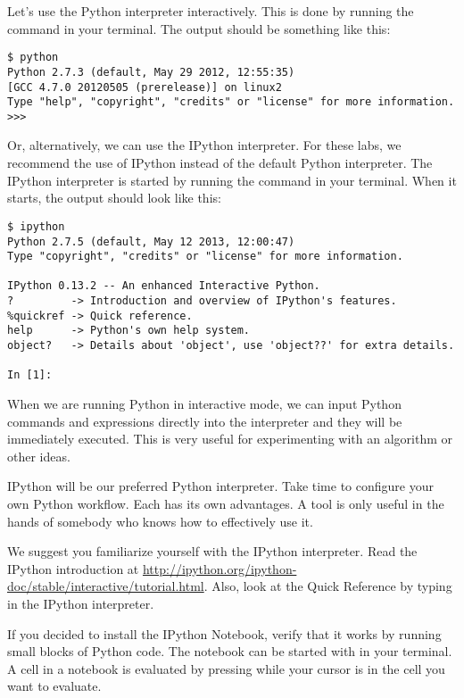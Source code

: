 Let's use the Python interpreter interactively.
This is done by running the command  in your terminal.
The output should be something like this:
\begin{lstlisting}
$ python
Python 2.7.3 (default, May 29 2012, 12:55:35)
[GCC 4.7.0 20120505 (prerelease)] on linux2
Type "help", "copyright", "credits" or "license" for more information.
>>>
\end{lstlisting}
Or, alternatively, we can use the IPython interpreter.
For these labs, we recommend the use of IPython instead of the default Python interpreter.
The IPython interpreter is started by running the command  in your terminal.
When it starts, the output should look like this:
\begin{lstlisting}
$ ipython
Python 2.7.5 (default, May 12 2013, 12:00:47)
Type "copyright", "credits" or "license" for more information.

IPython 0.13.2 -- An enhanced Interactive Python.
?         -> Introduction and overview of IPython's features.
%quickref -> Quick reference.
help      -> Python's own help system.
object?   -> Details about 'object', use 'object??' for extra details.

In [1]:
\end{lstlisting}
When we are running Python in interactive mode, we can input Python commands and expressions 
directly into the interpreter and they will be immediately executed.
This is very useful for experimenting with an algorithm or other ideas.

IPython will be our preferred Python interpreter.  Take time to configure your own Python
workflow.  Each has its own advantages.  A tool is only useful in the hands of somebody
who knows how to effectively use it.

We suggest you familiarize yourself with the IPython interpreter.
Read the IPython introduction at \url{http://ipython.org/ipython-doc/stable/interactive/tutorial.html}.
Also, look at the Quick Reference by typing  in the IPython interpreter.

If you decided to install the IPython Notebook, verify that it works by running small blocks of Python code.
The notebook can be started with  in your terminal.
A cell in a notebook is evaluated by pressing  while your cursor is in the cell you want to evaluate.

